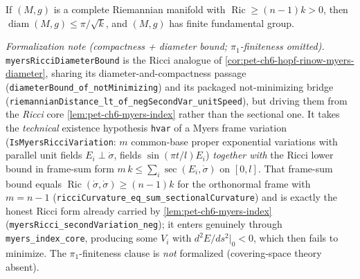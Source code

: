 \begin{theorem}
  \label{thm:pet-ch6-myers-ricci-diameter}
  \leanok
  If $(M,g)$ is a complete Riemannian manifold with $\operatorname{Ric}\ge(n-1)k>0$,
  then $\operatorname{diam}(M,g)\le\pi/\sqrt k$, and $(M,g)$ has finite fundamental
  group.

  \emph{Formalization note (compactness + diameter bound; $\pi_1$-finiteness omitted).}
  \texttt{myersRicciDiameterBound} is the Ricci analogue of
  \cref{cor:pet-ch6-hopf-rinow-myers-diameter}, sharing its diameter-and-compactness passage
  (\texttt{diameterBound\_of\_notMinimizing}) and its packaged not-minimizing bridge
  (\texttt{riemannianDistance\_lt\_of\_negSecondVar\_unitSpeed}), but driving them from the
  \emph{Ricci} core \cref{lem:pet-ch6-myers-index} rather than the sectional one. It takes the
  \emph{technical} existence hypothesis \texttt{hvar} of a Myers frame variation
  (\texttt{IsMyersRicciVariation}: $m$ common-base proper exponential variations with parallel
  unit fields $E_i\perp\dot\sigma$, fields $\sin(\pi t/l)E_i$) \emph{together with} the Ricci
  lower bound in frame-sum form $m\,k\le\sum_i\sec(E_i,\dot\sigma)$ on $[0,l]$. That frame-sum
  bound equals $\operatorname{Ric}(\dot\sigma,\dot\sigma)\ge(n-1)k$ for the orthonormal frame with
  $m=n-1$ (\texttt{ricciCurvature\_eq\_sum\_sectionalCurvature}) and is exactly the honest Ricci
  form already carried by \cref{lem:pet-ch6-myers-index}
  (\texttt{myersRicci\_secondVariation\_neg}); it enters genuinely through
  \texttt{myers\_index\_core}, producing some $V_i$ with $d^2E/ds^2|_0<0$, which then fails to
  minimize. The $\pi_1$-finiteness clause is \emph{not} formalized (covering-space theory absent).
\end{theorem}
